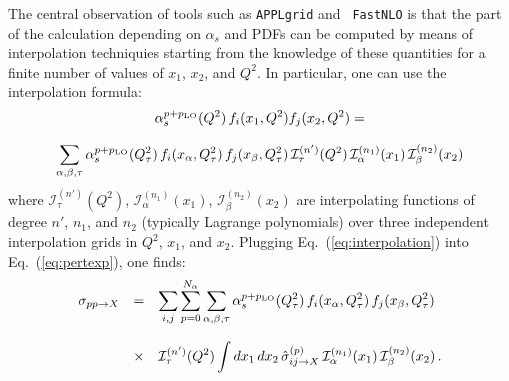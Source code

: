 \documentclass[preprint,12pt]{elsarticle}
\begin{document}
The central observation of tools such as {\tt APPLgrid} and {\tt
  FastNLO} is that the part of the calculation depending on $\alpha_s$
and PDFs can be computed by means of interpolation techniquies
starting from the knowledge of these quantities for a finite number of
values of $x_1$, $x_2$, and $Q^2$. In particular, one can use the
interpolation formula:
\begin{equation}\label{eq:interpolation}
\begin{array}{c}
\displaystyle \alpha_s^{p+p_{\rm LO}}(Q^2) \,f_i(x_1,Q^2) f_j(x_2,Q^2)
  =\\
\\
\displaystyle \sum_{\alpha,\beta,\tau} \alpha_s^{p+p_{\rm LO}}(Q_\tau^2)
  \,f_i(x_\alpha,Q_\tau^2)\,f_j(x_\beta,Q_\tau^2)
  \,\mathcal{I}_\tau^{(n')}(Q^2)\,\mathcal{I}_\alpha^{(n_1)}(x_1)
  \,\mathcal{I}_\beta^{(n_2)}(x_2)
\end{array}
\end{equation}
where $\mathcal{I}_\tau^{(n')}(Q^2)$,
$\mathcal{I}_\alpha^{(n_1)}(x_1)$, $\mathcal{I}_\beta^{(n_2)}(x_2)$
are interpolating functions of degree $n'$, $n_1$, and $n_2$
(typically Lagrange polynomials) over three independent interpolation
grids in $Q^2$, $x_1$, and $x_2$. Plugging
Eq.~(\ref{eq:interpolation}) into Eq.~(\ref{eq:pertexp}), one finds:
\begin{equation}\label{eq:XsecPDFs}
\begin{array}{rcl}
  \displaystyle \sigma_{pp\to X} &=& \displaystyle 
                                     \sum_{i,j}\sum_{p=0}^{N_\alpha} \sum_{\alpha,\beta,\tau} \alpha_s^{p+p_{\rm LO}}(Q_\tau^2)
                                     \,f_i(x_\alpha,Q_\tau^2)\,f_j(x_\beta,Q_\tau^2)\\
  \\
                                 &\times& \displaystyle \mathcal{I}_\tau^{(n')}(Q^2)\int dx_1\,dx_2\,
                                          \hat{\sigma}^{(p)}_{ij\to X}\,\mathcal{I}_\alpha^{(n_1)}(x_1)
                                          \,\mathcal{I}_\beta^{(n_2)}(x_2)\,.
\end{array}
\end{equation}
\end{document}
